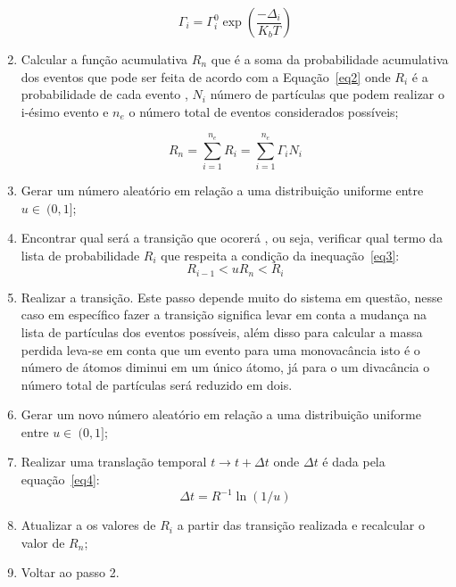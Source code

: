 \documentclass[11pt]{article}
\begin{document}
\begin{enumerate}
    \begin{equation}
        \Gamma_i = \Gamma_{i}^{0}\exp{\left({\frac{-\Delta_i}{K_b T}}\right)}
        \label{eq1}
    \end{equation}

\item Calcular a função acumulativa $R_n$ que é a soma da probabilidade acumulativa dos eventos que pode ser feita de acordo com a Equação~\ref{eq2} onde $R_i$ é a probabilidade de cada evento , $N_i$ número de partículas que podem realizar o i-ésimo evento e $n_e$ o número total de eventos considerados possíveis;

    \begin{equation}
        R_n = \sum_{i=1}^{n_e} R_i = \sum_{i=1}^{n_e} \Gamma_i N_i
        \label{eq2}
    \end{equation}

\item Gerar um número aleatório em relação a uma distribuição uniforme entre $u \in~(0,1]$;
\item Encontrar qual será a transição que ocorerá , ou seja, verificar qual termo da lista de probabilidade $R_i$ que respeita a condição da inequação~\ref{eq3}:
    \begin{equation}
    R_{i-1} < uR_n < R_i
    \label{eq3}
    \end{equation}

\item Realizar a transição. Este passo depende muito do sistema em questão, nesse caso em específico fazer a transição significa levar em conta a mudança na lista de partículas dos eventos possíveis, além disso para calcular a massa perdida leva-se em conta que um evento para uma monovacância isto é o número de átomos diminui em um único átomo, já para o um divacância o número total de partículas será reduzido em dois.

\item Gerar um novo número aleatório em relação a uma distribuição uniforme entre $u \in~(0,1]$;
\item Realizar uma translação temporal $t \rightarrow t+\Delta t$ onde $\Delta t$ é dada pela equação~\ref{eq4}:
    \begin{equation}
        \Delta t = R^{-1} \ln{(1/u)}
        \label{eq4}
    \end{equation}

\item Atualizar a os valores de $R_i$ a partir das transição realizada e recalcular o valor de $R_n$;
\item Voltar ao passo 2.

\end{enumerate}
\end{document}
